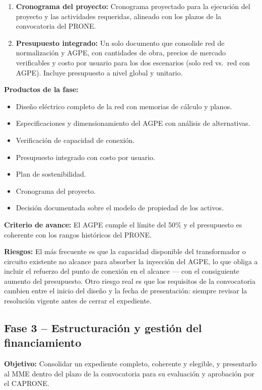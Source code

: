 \begin{enumerate}[label=\textbf{\arabic*.}, leftmargin=1.8cm, itemsep=6pt]
    \item \textbf{Cronograma del proyecto:} Cronograma proyectado para
    la ejecución del proyecto y las actividades requeridas, alineado con
    los plazos de la convocatoria del PRONE.

    \item \textbf{Presupuesto integrado:} Un solo documento que
    consolide red de normalización y AGPE, con cantidades de obra,
    precios de mercado verificables y costo por usuario para los dos
    escenarios (solo red vs.\ red con AGPE). Incluye presupuesto a nivel
    global y unitario.
\end{enumerate}

\textbf{Productos de la fase:}
\begin{itemize}
    \item Diseño eléctrico completo de la red con memorias de cálculo y
    planos.
    \item Especificaciones y dimensionamiento del AGPE con análisis de
    alternativas.
    \item Verificación de capacidad de conexión.
    \item Presupuesto integrado con costo por usuario.
    \item Plan de sostenibilidad.
    \item Cronograma del proyecto.
    \item Decisión documentada sobre el modelo de propiedad de los
    activos.
\end{itemize}

\textbf{Criterio de avance:} El AGPE cumple el límite del 50\% y el
presupuesto es coherente con los rangos históricos del PRONE.

\textbf{Riesgos:} El más frecuente es que la capacidad disponible del
transformador o circuito existente no alcance para absorber la inyección
del AGPE, lo que obliga a incluir el refuerzo del punto de conexión en
el alcance — con el consiguiente aumento del presupuesto. Otro riesgo
real es que los requisitos de la convocatoria cambien entre el inicio
del diseño y la fecha de presentación: siempre revisar la resolución
vigente antes de cerrar el expediente.

\subsection{Fase 3 -- Estructuración y gestión del financiamiento}
\label{subsec:fase3}

\textbf{Objetivo:} Consolidar un expediente completo, coherente y
elegible, y presentarlo al MME dentro del plazo de la convocatoria para
su evaluación y aprobación por el CAPRONE.

